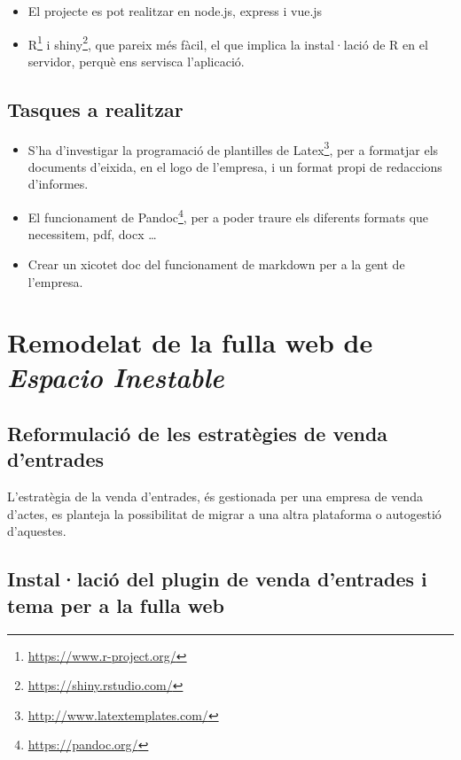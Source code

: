 \documentclass[
  10pt,
]{krantz}
\DeclareRobustCommand{\href}[2]{#2\footnote{\url{#1}}}
\providecommand{\tightlist}{%
  \setlength{\itemsep}{0pt}\setlength{\parskip}{0pt}}
\begin{document}
\begin{itemize}
\tightlist
\item
  El projecte es pot realitzar en node.js, express i vue.js
\item
  \href{https://www.r-project.org/}{R} i \href{https://shiny.rstudio.com/}{shiny}, que pareix més fàcil, el que implica la instal·lació de R en el servidor, perquè ens servisca l'aplicació.
\end{itemize}

\hypertarget{tasques-a-realitzar}{%
\section{Tasques a realitzar}\label{tasques-a-realitzar}}

\begin{itemize}
\tightlist
\item
  S'ha d'investigar la programació de plantilles de \href{http://www.latextemplates.com/}{Latex}, per a formatjar els documents d'eixida, en el logo de l'empresa, i un format propi de redaccions d'informes.
\item
  El funcionament de \href{https://pandoc.org/}{Pandoc}, per a poder traure els diferents formats que necessitem, pdf, docx \ldots{}
\item
  Crear un xicotet doc del funcionament de markdown per a la gent de l'empresa.
\end{itemize}

\hypertarget{remodelat-de-la-fulla-web-de-espacio-inestable}{%
\chapter{\texorpdfstring{Remodelat de la fulla web de \emph{Espacio Inestable}}{Remodelat de la fulla web de Espacio Inestable}}\label{remodelat-de-la-fulla-web-de-espacio-inestable}}

\hypertarget{reformulaciuxf3-de-les-estratuxe8gies-de-venda-dentrades}{%
\section{Reformulació de les estratègies de venda d'entrades}\label{reformulaciuxf3-de-les-estratuxe8gies-de-venda-dentrades}}

L'estratègia de la venda d'entrades, és gestionada per una empresa de venda d'actes, es planteja la possibilitat de migrar a una altra plataforma o autogestió d'aquestes.

\hypertarget{installaciuxf3-del-plugin-de-venda-dentrades-i-tema-per-a-la-fulla-web}{%
\section{Instal·lació del plugin de venda d'entrades i tema per a la fulla web}\label{installaciuxf3-del-plugin-de-venda-dentrades-i-tema-per-a-la-fulla-web}}
\end{document}

